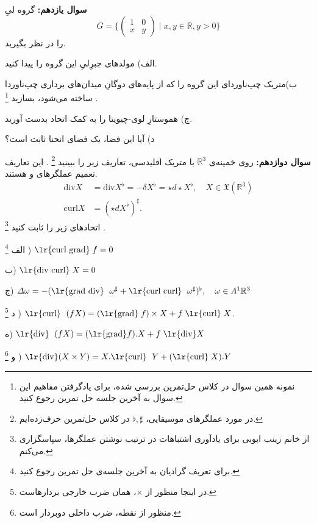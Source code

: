 \documentclass{article}
\newenvironment{parind}{%
	\par%
	\medskip
	\leftskip=0mm\rightskip=7mm
	\noindent\ignorespaces}{%
	\par\medskip}
\begin{document}
	
	\vspace{-1em}
	\endline
	
	\vspace{-1em}
	\textbf{سوال یازدهم:}
	گروه لیِ 
	\[
	G = \Biggl\{
	\begin{pmatrix}
		1 & 0 \\ x & y
	\end{pmatrix} \; \Big| \; x,y\in \mathbb{R} , y>0
	\Biggr\}
	\]
	را در نظر بگیرید.
	\begin{parind}
		الف) مولد‌های جبرِلیِ این گروه را پیدا کنید.
		
		ب)متریک چپ‌ناوردای این گروه را که از پایه‌های دوگانِ میدان‌های برداری چپ‌ناوردا ساخته می‌شود، بسازید
		\footnote{نمونه همین سوال در کلاس حل‌تمرین بررسی شده، برای یادگرفتن مفاهیم این سوال به آخرین جلسه حل تمرین رجوع کنید.}
		.
		
		ج) هموستارِ
		لوی-چیویتا را به کمک اتحاد
		بدست آورید.
		
		د) آیا این فضا، یک فضای انحنا ثابت است؟
	\end{parind}
	
	
	\vspace{-1em}
	\endline
	
	\vspace{-1em}
	\textbf{سوال دوازدهم:}
	روی خمینه‌ی 
	$\mathbb{R}^3$
	با متریک اقلیدسی، تعاریف زیر را ببینید
	\footnote{در مورد عملگر‌های موسیقایی، 
	$\flat,\sharp$ در کلاس حل‌تمرین حرف‌زده‌ایم.}
	.
	این تعاریف تعمیم عملگرهای 
	و 
	هستند.
	\newpage
		\begin{equation*}
		\begin{aligned}
			\text{div} X &= \text{div} X^\flat = - \delta X^\flat = \star d \star X^\flat , \quad X \in \mathfrak{X}(\mathbb{R}^3) 
			\\ 
			\text{curl} X &= (\star dX^\flat)^\sharp.
		\end{aligned}
	\end{equation*}
اتحاد‌های زیر را ثابت کنید
\footnote{از خانم زینب ایوبی برای یادآوری اشتباهات  در ترتیب نوشتن عملگرها، سپاسگزاری می‌کنم.}
.
\begin{parind}
	الف
	\footnote{برای تعریف گرادیان به آخرین جلسه‌ی حل تمرین رجوع کنید.}
	) 
	$\text{\lr{curl grad}}\; f =0$
	
	ب)
	$\text{\lr{div curl}}\; X=0$
	
	ج) 
	$\Delta \omega = -(\text{\lr{grad div} }\; \omega^\sharp + \text{\lr{curl curl} }\; \omega^\sharp)^\flat , \quad \omega \in \Lambda^1 \mathbb{R}^3$
	
	د
	\footnote{در اینجا منظور از 
	$\times$، 
	همان ضرب خارجی بردارهاست.}
	)
	$\text{\lr{curl} }\;(fX) = (\text{\lr{grad}}\; f)\times X + f\; \text{\lr{curl}}\; X $.
	
	ه)
	$\text{\lr{div} }\;(fX) = (\text{\lr{grad}} f). X + f \;\text{\lr{div}} X $
	
	و
	\footnote{منظور از نقطه، ضرب داخلی دوبردار است.}
	) 
	$\text{\lr{div}} (X\times Y) = X. \text{\lr{curl} }\;Y + (\text{\lr{curl}}\; X).Y$
\end{parind}
	
\end{document}
